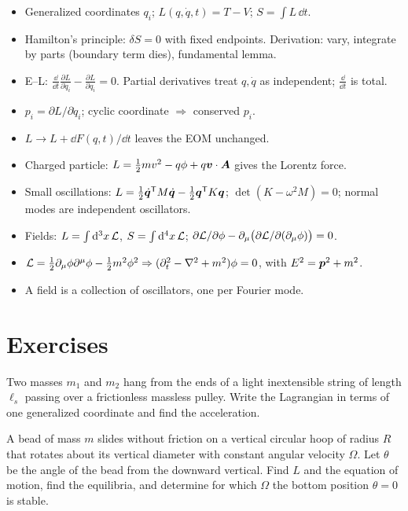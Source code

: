 \documentclass[11pt]{article}
\begin{document}
\begin{itemize}
  \item Generalized coordinates $q_i$; $L(q,\dot q,t)=T-V$; $S=\int L\,\dd t$.
  \item Hamilton's principle: $\delta S=0$ with fixed endpoints. Derivation: vary, integrate by parts (boundary term dies), fundamental lemma.
  \item E--L: $\frac{\dd}{\dd t}\frac{\partial L}{\partial\dot q_i}-\frac{\partial L}{\partial q_i}=0$. Partial derivatives treat $q,\dot q$ as independent; $\frac{\dd}{\dd t}$ is total.
  \item $p_i=\partial L/\partial\dot q_i$; cyclic coordinate $\Rightarrow$ conserved $p_i$.
  \item $L\to L+\dd F(q,t)/\dd t$ leaves the EOM unchanged.
  \item Charged particle: $L=\tfrac12mv^2-q\phi+q\bm{v}\cdot\bm{A}$ gives the Lorentz force.
  \item Small oscillations: $L=\tfrac12\dot{\bm{q}}^{\mathsf T}M\dot{\bm{q}}-\tfrac12\bm{q}^{\mathsf T}K\bm{q}$; $\det(K-\omega^2M)=0$; normal modes are independent oscillators.
  \item Fields: $L=\int\mathrm{d}^3x\,\mathcal{L}$, $S=\int\mathrm{d}^4x\,\mathcal{L}$; $\partial\mathcal{L}/\partial\phi-\partial_\mu\bigl(\partial\mathcal{L}/\partial(\partial_\mu\phi)\bigr)=0$.
  \item $\mathcal{L}=\tfrac12\partial_\mu\phi\partial^\mu\phi-\tfrac12m^2\phi^2\Rightarrow(\partial_t^2-\nabla^2+m^2)\phi=0$, with $E^2=\bm{p}^2+m^2$.
  \item A field is a collection of oscillators, one per Fourier mode.
\end{itemize}

\section{Exercises}

\begin{exercise}\label{ex:atwood}
Two masses $m_1$ and $m_2$ hang from the ends of a light inextensible string of length $\ell_s$ passing over a frictionless massless pulley. Write the Lagrangian in terms of one generalized coordinate and find the acceleration.
\end{exercise}

\begin{exercise}\label{ex:hoop}
A bead of mass $m$ slides without friction on a vertical circular hoop of radius $R$ that rotates about its vertical diameter with constant angular velocity $\Omega$. Let $\theta$ be the angle of the bead from the downward vertical. Find $L$ and the equation of motion, find the equilibria, and determine for which $\Omega$ the bottom position $\theta=0$ is stable.
\end{exercise}
\end{document}
